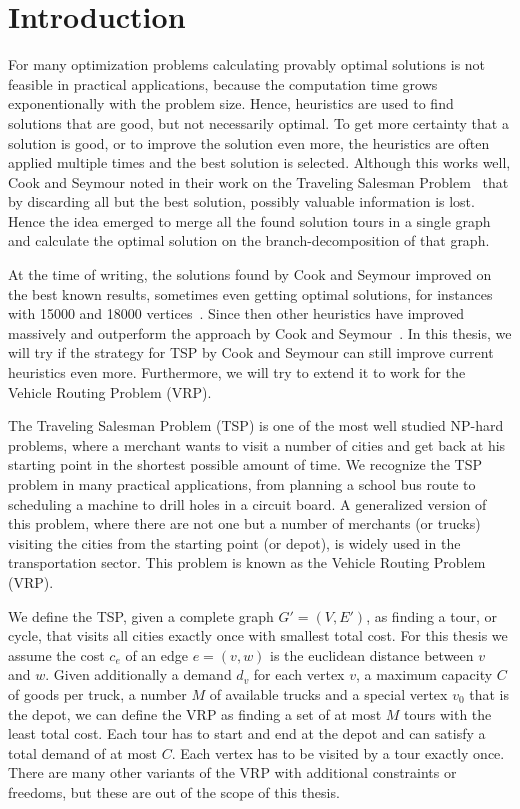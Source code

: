 \documentclass[12pt]{article}
\begin{document}
\section{Introduction}
\label{sec:introduction}
For many optimization problems calculating provably optimal solutions is not feasible in practical
applications, because the computation time grows exponentionally with the problem size. Hence,
heuristics are used to find solutions that are good, but not necessarily optimal.
To get more certainty that a solution is good, or to improve the solution even more, the heuristics
are often applied multiple times and the best solution is selected. Although this works well, Cook
and Seymour noted in their work on the Traveling Salesman Problem~\cite{cook-seymour} that by
discarding all but the best solution, possibly valuable information is lost. Hence the idea emerged
to merge all the found solution tours in a single graph and calculate the optimal solution on the
branch-decomposition of that graph.

At the time of writing, the solutions found by Cook and Seymour improved on the best known
results, sometimes even getting optimal solutions, for instances with 15000 and 18000
vertices~\cite{cook-seymour}. Since then other heuristics have improved massively and outperform the
approach by Cook and Seymour~\cite{lkh2}. In this thesis, we will try if the strategy for TSP by
Cook and Seymour can still improve current heuristics even more. Furthermore, we will try to extend
it to work for the Vehicle Routing Problem (VRP).

The Traveling Salesman Problem (TSP) is one of the most well studied NP-hard problems, where a
merchant wants to visit a number of cities and get back at his starting point in the shortest
possible amount of time.
We recognize the TSP problem in many practical applications, from planning a school bus route to
scheduling a machine to drill holes in a circuit board.
A generalized version of this problem, where there are not one but a number of merchants (or trucks)
visiting the cities from the starting point (or depot), is widely used in the transportation sector.
This problem is known as the Vehicle Routing Problem (VRP).

We define the TSP, given a complete graph $G' = (V, E')$, as finding a tour, or cycle, that visits
all cities exactly once with smallest total cost. For this thesis we assume the cost $c_e$ of an
edge $e = (v, w)$ is the euclidean distance between $v$ and $w$.
Given additionally a demand $d_v$ for each vertex $v$, a maximum capacity $C$ of goods per truck, a
number $M$ of available trucks and a special vertex $v_0$ that is the depot, we can define the VRP
as finding a set of at most $M$ tours with the least total cost. Each tour has to start and end at
the depot and can satisfy a total demand of at most $C$. Each vertex has to be visited by a tour
exactly once.
There are many other variants of the VRP with additional constraints or freedoms, but these are out
of the scope of this thesis.
\end{document}
